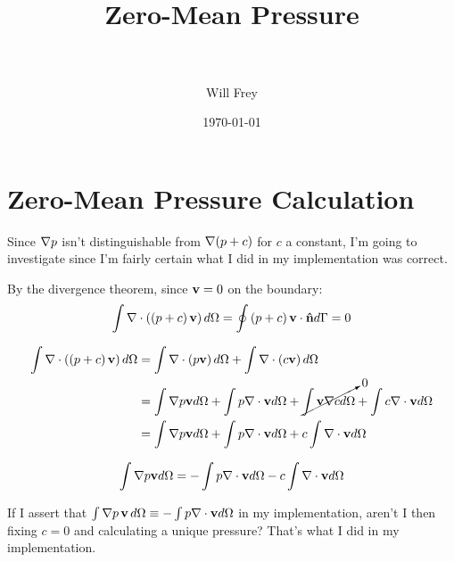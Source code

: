 \documentclass[paper=a4, fontsize=11pt]{scrartcl} %
\title{	
    \normalfont \normalsize 
    \horrule{0.5pt} \\[0.4cm] %
    \huge Zero-Mean Pressure \\ %
    \horrule{2pt} \\[0.5cm] %
}
\author{Will Frey} %
\date{\normalsize\today} %
\numberwithin{equation}{section} %
\numberwithin{figure}{section} %
\numberwithin{table}{section} %
\begin{document}
\maketitle %


\section{Zero-Mean Pressure Calculation}

Since $\nabla p$ isn't distinguishable from $\nabla (p + c)$ for $c$ a constant,
I'm going to investigate since I'm fairly certain what I did in my
implementation was correct.

By the divergence theorem, since $\mathbf{v} = 0$ on the boundary:
\begin{equation*}
    \int \nabla \cdot \left( \left( p + c \right) \mathbf{v} \right) d\Omega
    =  \oint \left( p + c \right)\mathbf{v} \cdot \mathbf{\hat{n}} d\Gamma = 0
\end{equation*}

\begin{align*}
    \begin{split}
        \int \nabla \cdot \left( \left( p + c \right) \mathbf{v} \right) d\Omega
        &=  \int \nabla \cdot \left( p \mathbf{v} \right) d\Omega +
        \int \nabla \cdot \left( c \mathbf{v} \right) d\Omega \\
        &=  \int \nabla p \mathbf{v} d\Omega +
        \int p \nabla \cdot \mathbf{v} d\Omega +
        \cancelto{0}{\int \mathbf{v} \nabla c d\Omega} +
        \int c \nabla \cdot \mathbf{v} d\Omega \\
        &=  \int \nabla p \mathbf{v} d\Omega +
        \int p \nabla \cdot \mathbf{v} d\Omega +
        c \int \nabla \cdot \mathbf{v} d\Omega
    \end{split}
\end{align*}

\begin{equation*}
    \int \nabla p \mathbf{v} d\Omega
    =  -\int p \nabla \cdot \mathbf{v} d\Omega -
    c \int \nabla \cdot \mathbf{v} d\Omega 
\end{equation*}

If I assert that $\int \nabla p \, \mathbf{v} \, d\Omega \equiv - \int p \nabla \cdot
\mathbf{v}  d\Omega$ in my implementation, aren't I then fixing $c = 0$ and
calculating a unique pressure? That's what I did in my implementation.
\end{document}
